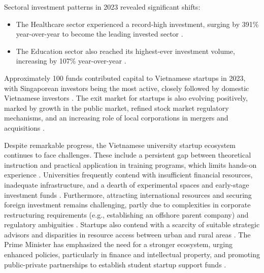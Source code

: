 \documentclass[../Main.tex]{subfiles}%
\begin{document}
	Sectoral investment patterns in 2023 revealed significant shifts:
	\begin{itemize}
	\item The Healthcare sector experienced a record-high investment, surging by 391\% year-over-year to become the leading invested sector \cite{vietnam_innovation_report_2024}.
	\item The Education sector also reached its highest-ever investment volume, increasing by 107\% year-over-year \cite{vietnam_innovation_report_2024}.
	\end{itemize}
	Approximately 100 funds contributed capital to Vietnamese startups in 2023, with Singaporean investors being the most active, closely followed by domestic Vietnamese investors \cite{vietnam_innovation_report_2024}. The exit market for startups is also evolving positively, marked by growth in the public market, refined stock market regulatory mechanisms, and an increasing role of local corporations in mergers and acquisitions \cite{vietnam_innovation_report_2024}.

	Despite remarkable progress, the Vietnamese university startup ecosystem continues to face challenges. These include a persistent gap between theoretical instruction and practical application in training programs, which limits hands-on experience \cite{nhandan2025startup}. Universities frequently contend with insufficient financial resources, inadequate infrastructure, and a dearth of experimental spaces and early-stage investment funds \cite{nhandan2025startup}. Furthermore, attracting international resources and securing foreign investment remains challenging, partly due to complexities in corporate restructuring requirements (e.g., establishing an offshore parent company) and regulatory ambiguities \cite{bssc2025wave, nssc2024challenges}. Startups also contend with a scarcity of suitable strategic advisors and disparities in resource access between urban and rural areas \cite{ueh2024vc}. The Prime Minister has emphasized the need for a stronger ecosystem, urging enhanced policies, particularly in finance and intellectual property, and promoting public-private partnerships to establish student startup support funds \cite{vietnamnews2025pm}.
	
\end{document}
